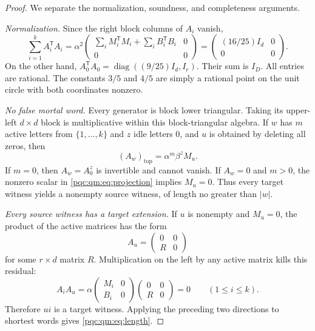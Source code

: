 \documentclass[11pt,letterpaper]{article}
\numberwithin{equation}{section}
\theoremstyle{definition}
\theoremstyle{remark}
\newcommand{\R}{\mathbb R}
\newcommand{\diag}{\operatorname{diag}}
\begin{document}
\begin{proof}
We separate the normalization, soundness, and completeness arguments.

\emph{Normalization.} Since the right block columns of $A_i$ vanish,
\[
 \sum_{i=1}^k A_i^{\mathsf T}A_i
 =\alpha^2
 \begin{pmatrix}
 \sum_iM_i^{\mathsf T}M_i+\sum_iB_i^{\mathsf T}B_i&0\\0&0
 \end{pmatrix}
 =\begin{pmatrix}(16/25)I_d&0\\0&0\end{pmatrix}.
\]
On the other hand,
$A_0^{\mathsf T}A_0=\diag((9/25)I_d,I_r)$. Their sum is $I_D$. All entries are rational. The constants $3/5$ and $4/5$ are simply a rational point on the unit circle with both coordinates nonzero.

\emph{No false mortal word.} Every generator is block lower triangular. Taking its upper-left $d\times d$ block is multiplicative within this block-triangular algebra. If $w$ has $m$ active letters from $\{1,\ldots,k\}$ and $z$ idle letters $0$, and $u$ is obtained by deleting all zeros, then
\begin{equation}
 (A_w)_{\mathrm{top}}=\alpha^m\beta^z M_u.
 \label{pqc:qm:eq:projection}
\end{equation}
If $m=0$, then $A_w=A_0^z$ is invertible and cannot vanish. If $A_w=0$ and $m>0$, the nonzero scalar in \eqref{pqc:qm:eq:projection} implies $M_u=0$. Thus every target witness yields a nonempty source witness, of length no greater than $|w|$.

\emph{Every source witness has a target extension.} If $u$ is nonempty and $M_u=0$, the product of the active matrices has the form
\[
 A_u=\begin{pmatrix}0&0\\R&0\end{pmatrix}
\]
for some $r\times d$ matrix $R$. Multiplication on the left by any active matrix kills this residual:
\begin{equation}
 A_iA_u=\alpha
 \begin{pmatrix}M_i&0\\B_i&0\end{pmatrix}
 \begin{pmatrix}0&0\\R&0\end{pmatrix}=0
 \qquad(1\leq i\leq k).
 \label{pqc:qm:eq:flush}
\end{equation}
Therefore $ui$ is a target witness. Applying the preceding two directions to shortest words gives \eqref{pqc:qm:eq:length}.
\end{proof}
\end{document}
